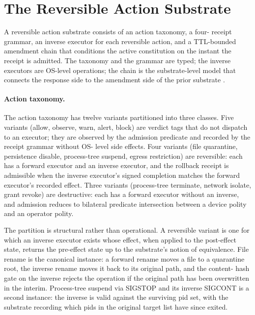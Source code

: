 \section{The Reversible Action Substrate}
\label{sec:substrate-ra}

A reversible action substrate consists of an action taxonomy, a four-
receipt grammar, an inverse executor for each reversible action, and a
TTL-bounded amendment chain that conditions the active constitution on
the instant the receipt is admitted. The taxonomy and the grammar are
typed; the inverse executors are OS-level operations; the chain is the
substrate-level model that connects the response side to the amendment
side of the prior substrate
\cite{programmableSovereigntyAnonymous}.

\paragraph{Action taxonomy.}
The action taxonomy has twelve variants partitioned into three classes.
Five variants (allow, observe, warn, alert, block) are verdict tags
that do not dispatch to an executor; they are observed by the
admission predicate and recorded by the receipt grammar without OS-
level side effects. Four variants (file quarantine, persistence
disable, process-tree suspend, egress restriction) are reversible:
each has a forward executor and an inverse executor, and the rollback
receipt is admissible when the inverse executor's signed completion
matches the forward executor's recorded effect. Three variants
(process-tree terminate, network isolate, grant revoke) are
destructive: each has a forward executor without an inverse, and
admission reduces to bilateral predicate intersection between a device
polity and an operator polity.

The partition is structural rather than operational. A reversible
variant is one for which an inverse executor exists whose effect, when
applied to the post-effect state, returns the pre-effect state up to
the substrate's notion of equivalence. File rename is the canonical
instance: a forward rename moves a file to a quarantine root, the
inverse rename moves it back to its original path, and the content-
hash gate on the inverse rejects the operation if the original path
has been overwritten in the interim. Process-tree suspend via SIGSTOP
and its inverse SIGCONT is a second instance: the inverse is valid
against the surviving pid set, with the substrate recording which pids
in the original target list have since exited.

